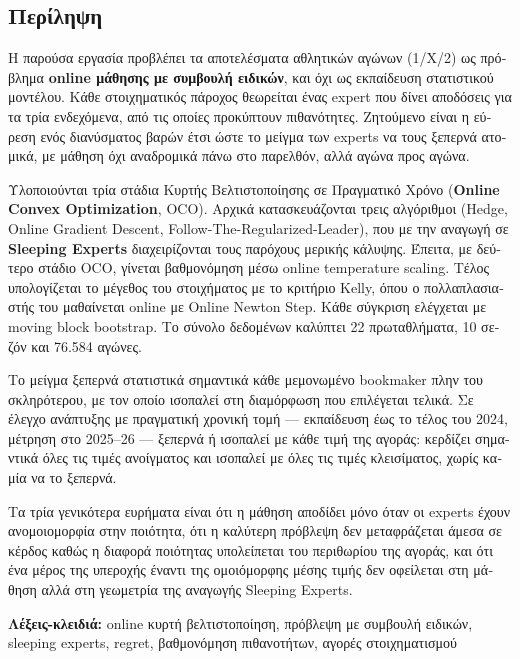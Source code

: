 \documentclass[12pt,a4paper,oneside]{report}
\renewcommand{\_}{\oldunderscore\allowbreak}
\theoremstyle{definition}
\theoremstyle{plain}
\theoremstyle{remark}
\begin{document}
\begin{greek}
\chapter*{Περίληψη}

Η παρούσα εργασία προβλέπει τα αποτελέσματα αθλητικών αγώνων (1/Χ/2) ως πρόβλημα
\textbf{online μάθησης με συμβουλή ειδικών}, και όχι ως εκπαίδευση στατιστικού μοντέλου.
Κάθε στοιχηματικός πάροχος θεωρείται ένας expert που δίνει αποδόσεις για τα τρία ενδεχόμενα,
από τις οποίες προκύπτουν πιθανότητες. Ζητούμενο είναι η εύρεση ενός διανύσματος βαρών έτσι
ώστε το μείγμα των experts να τους ξεπερνά ατομικά, με μάθηση όχι αναδρομικά πάνω στο
παρελθόν, αλλά αγώνα προς αγώνα.

Υλοποιούνται τρία στάδια Κυρτής Βελτιστοποίησης σε Πραγματικό Χρόνο (\textbf{Online Convex
Optimization}, OCO). Αρχικά κατασκευάζονται τρεις αλγόριθμοι (Hedge, Online Gradient Descent,
Follow-The-Regularized-Leader), που με την αναγωγή σε \textbf{Sleeping Experts} διαχειρίζονται
τους παρόχους μερικής κάλυψης. Έπειτα, με δεύτερο στάδιο OCO, γίνεται βαθμονόμηση μέσω online
temperature scaling. Τέλος υπολογίζεται το μέγεθος του στοιχήματος με το κριτήριο Kelly, όπου
ο πολλαπλασιαστής του μαθαίνεται online με Online Newton Step. Κάθε σύγκριση ελέγχεται με
moving block bootstrap. Το σύνολο δεδομένων καλύπτει 22 πρωταθλήματα, 10 σεζόν και 76.584
αγώνες.

Το μείγμα ξεπερνά στατιστικά σημαντικά κάθε μεμονωμένο bookmaker πλην του σκληρότερου, με
τον οποίο ισοπαλεί στη διαμόρφωση που επιλέγεται τελικά. Σε έλεγχο ανάπτυξης με πραγματική
χρονική τομή --- εκπαίδευση έως το τέλος του 2024, μέτρηση στο 2025--26 --- ξεπερνά ή
ισοπαλεί με κάθε τιμή της αγοράς: κερδίζει σημαντικά όλες τις τιμές ανοίγματος και ισοπαλεί
με όλες τις τιμές κλεισίματος, χωρίς καμία να το ξεπερνά.

Τα τρία γενικότερα ευρήματα είναι ότι η μάθηση αποδίδει μόνο όταν οι experts έχουν
ανομοιομορφία στην ποιότητα, ότι η καλύτερη πρόβλεψη δεν μεταφράζεται άμεσα σε κέρδος καθώς
η διαφορά ποιότητας υπολείπεται του περιθωρίου της αγοράς, και ότι ένα μέρος της υπεροχής
έναντι της ομοιόμορφης μέσης τιμής δεν οφείλεται στη μάθηση αλλά στη γεωμετρία της αναγωγής
Sleeping Experts.

\vspace{1em}
\noindent\textbf{Λέξεις-κλειδιά:} online κυρτή βελτιστοποίηση, πρόβλεψη με συμβουλή ειδικών,
sleeping experts, regret, βαθμονόμηση πιθανοτήτων, αγορές στοιχηματισμού
\end{greek}
\end{document}
